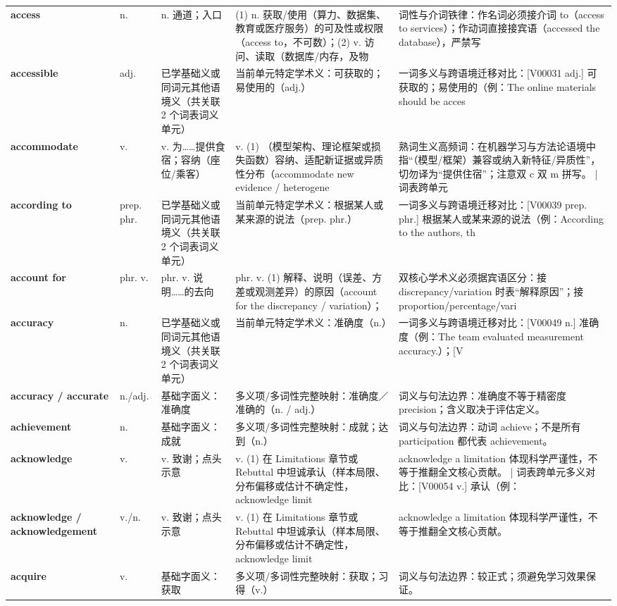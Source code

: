 \begin{longtable}{>{\raggedright\arraybackslash}p{2.5cm}>{\raggedright\arraybackslash}p{1.6cm}>{\raggedright\arraybackslash}p{3.2cm}>{\raggedright\arraybackslash}p{3.6cm}>{\raggedright\arraybackslash}p{3.3cm}}
\textbf{access} & n. & n. 通道；入口 & (1)  n. 获取/使用（算力、数据集、教育或医疗服务）的可及性或权限（access to，不可数）；(2)  v. 访问、读取（数据库/内存，及物 & 词性与介词铁律：作名词必须接介词 to（access to services）；作动词直接接宾语（accessed the database），严禁写 \tabularnewline
\textbf{accessible} & adj. & 已学基础义或同词元其他语境义（共关联 2 个词表词义单元） & 当前单元特定学术义：可获取的；易使用的（adj.） & 一词多义与跨语境迁移对比：[V00031 adj.] 可获取的；易使用的（例：The online materials should be acces \tabularnewline
\textbf{accommodate} & v. & v. 为……提供食宿；容纳（座位/乘客） & v. (1) （模型架构、理论框架或损失函数）容纳、适配新证据或异质性分布（accommodate new evidence / heterogene & 熟词生义高频词：在机器学习与方法论语境中指“（模型/框架）兼容或纳入新特征/异质性”，切勿译为“提供住宿”；注意双 c 双 m 拼写。 | 词表跨单元 \tabularnewline
\textbf{according to} & prep. phr. & 已学基础义或同词元其他语境义（共关联 2 个词表词义单元） & 当前单元特定学术义：根据某人或某来源的说法（prep. phr.） & 一词多义与跨语境迁移对比：[V00039 prep. phr.] 根据某人或某来源的说法（例：According to the authors, th \tabularnewline
\textbf{account for} & phr. v. & phr. v. 说明……的去向 & phr. v. (1)  解释、说明（误差、方差或观测差异）的原因（account for the discrepancy / variation）； & 双核心学术义必须据宾语区分：接 discrepancy/variation 时表“解释原因”；接 proportion/percentage/vari \tabularnewline
\textbf{accuracy} & n. & 已学基础义或同词元其他语境义（共关联 2 个词表词义单元） & 当前单元特定学术义：准确度（n.） & 一词多义与跨语境迁移对比：[V00049 n.] 准确度（例：The team evaluated measurement accuracy.）；[V \tabularnewline
\textbf{accuracy / accurate} & n./adj. & 基础字面义：准确度 & 多义项/多词性完整映射：准确度／准确的（n. / adj.） & 词义与句法边界：准确度不等于精密度 precision；含义取决于评估定义。 \tabularnewline
\textbf{achievement} & n. & 基础字面义：成就 & 多义项/多词性完整映射：成就；达到（n.） & 词义与句法边界：动词 achieve；不是所有 participation 都代表 achievement。 \tabularnewline
\textbf{acknowledge} & v. & v. 致谢；点头示意 & v. (1)  在 Limitations 章节或 Rebuttal 中坦诚承认（样本局限、分布偏移或估计不确定性，acknowledge limit & acknowledge a limitation 体现科学严谨性，不等于推翻全文核心贡献。 | 词表跨单元多义对比：[V00054 v.] 承认（例： \tabularnewline
\textbf{acknowledge / acknowledgement} & v./n. & v. 致谢；点头示意 & v. (1)  在 Limitations 章节或 Rebuttal 中坦诚承认（样本局限、分布偏移或估计不确定性，acknowledge limit & acknowledge a limitation 体现科学严谨性，不等于推翻全文核心贡献。 \tabularnewline
\textbf{acquire} & v. & 基础字面义：获取 & 多义项/多词性完整映射：获取；习得（v.） & 词义与句法边界：较正式；须避免学习效果保证。 \tabularnewline

\end{longtable}
